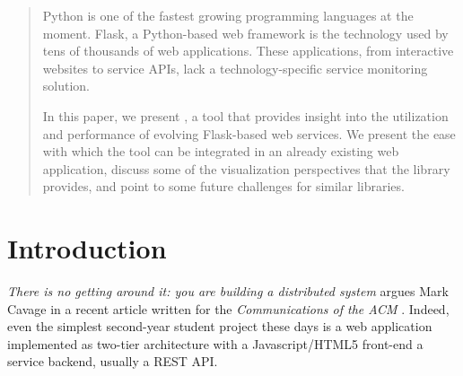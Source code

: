 
\begin{abstract}

  Python is one of the fastest growing programming languages at the moment. Flask, a Python-based web framework is the technology used by tens of thousands of web applications. These applications, from interactive websites to service APIs, lack a technology-specific service monitoring solution. 

  In this paper, we present \tool, a tool that provides insight into the utilization and performance of evolving Flask-based web services. We present the ease with which the tool can be integrated in an already existing web application, discuss some of the visualization perspectives that the library provides, and point to some future challenges for similar libraries.

\end{abstract}




\section{Introduction}




{\em There is no getting around it: you are building a distributed system} argues Mark Cavage  in a recent article written for the {\em Communications of the ACM} \cite{cavage2013there}. Indeed, even the simplest second-year student project these days is a web application implemented as two-tier architecture with a Javascript/HTML5 front-end a service backend, usually a REST API.

